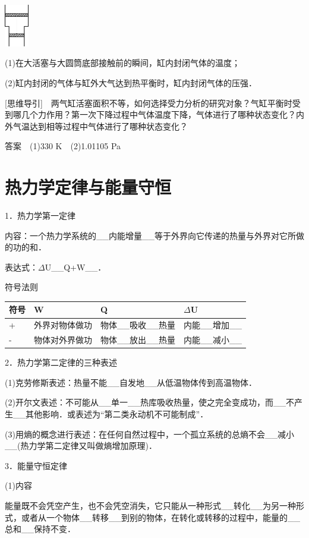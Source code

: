 \begin{center}\includegraphics[width=0.41528in,height=0.72639in]{media/image501.png}\end{center}
(1)在大活塞与大圆筒底部接触前的瞬间，缸内封闭气体的温度；

(2)缸内封闭的气体与缸外大气达到热平衡时，缸内封闭气体的压强．

{[}思维导引{]}　两气缸活塞面积不等，如何选择受力分析的研究对象？气缸平衡时受到哪几个力作用？第一次下降过程中气体温度下降，气体进行了哪种状态变化？内外气温达到相等过程中气体进行了哪种状态变化？

答案　(1)330 K　(2)1.01105 Pa
\section{热力学定律与能量守恒}


1．热力学第一定律

内容：一个热力学系统的\_\_内能增量\_\_等于外界向它传递的热量与外界对它所做的功的和．

表达式：$\Delta$U\_\_Q+W\_\_．

符号法则

\begin{longtable}[]{@{}llll@{}}
\toprule
符号 & W & Q & $\Delta$U\tabularnewline
\midrule
\endhead
+ & 外界对物体做功 & 物体\_\_吸收\_\_热量 &
内能\_\_增加\_\_\tabularnewline
- & 物体对外界做功 & 物体\_\_放出\_\_热量 &
内能\_\_减小\_\_\tabularnewline
\bottomrule
\end{longtable}

2．热力学第二定律的三种表述

(1)克劳修斯表述：热量不能\_\_自发地\_\_从低温物体传到高温物体．

(2)开尔文表述：不可能从\_\_单一\_\_热库吸收热量，使之完全变成功，而\_\_不产生\_\_其他影响．或表述为``第二类永动机不可能制成''．

(3)用熵的概念进行表述：在任何自然过程中，一个孤立系统的总熵不会\_\_减小\_\_(热力学第二定律又叫做熵增加原理)．

3．能量守恒定律

(1)内容

能量既不会凭空产生，也不会凭空消失，它只能从一种形式\_\_转化\_\_为另一种形式，或者从一个物体\_\_转移\_\_到别的物体，在转化或转移的过程中，能量的\_\_总和\_\_保持不变．

